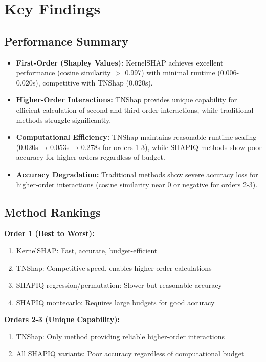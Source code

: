 \documentclass{article}
\begin{document}
\section{Key Findings}

\subsection{Performance Summary}

\begin{itemize}
\item \textbf{First-Order (Shapley Values):} KernelSHAP achieves excellent performance (cosine similarity $>$ 0.997) with minimal runtime (0.006-0.020s), competitive with TNShap (0.020s).

\item \textbf{Higher-Order Interactions:} TNShap provides unique capability for efficient calculation of second and third-order interactions, while traditional methods struggle significantly.

\item \textbf{Computational Efficiency:} TNShap maintains reasonable runtime scaling (0.020s → 0.053s → 0.278s for orders 1-3), while SHAPIQ methods show poor accuracy for higher orders regardless of budget.

\item \textbf{Accuracy Degradation:} Traditional methods show severe accuracy loss for higher-order interactions (cosine similarity near 0 or negative for orders 2-3).
\end{itemize}

\subsection{Method Rankings}

\textbf{Order 1 (Best to Worst):}
\begin{enumerate}
\item KernelSHAP: Fast, accurate, budget-efficient
\item TNShap: Competitive speed, enables higher-order calculations
\item SHAPIQ regression/permutation: Slower but reasonable accuracy
\item SHAPIQ montecarlo: Requires large budgets for good accuracy
\end{enumerate}

\textbf{Orders 2-3 (Unique Capability):}
\begin{enumerate}
\item TNShap: Only method providing reliable higher-order interactions
\item All SHAPIQ variants: Poor accuracy regardless of computational budget
\end{enumerate}
\end{document}
